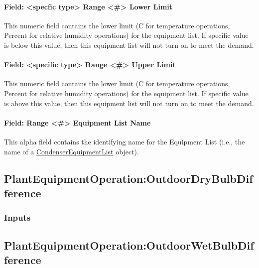 \paragraph{Field: \textless{}specfic type\textgreater{} Range \textless{}\#\textgreater{} Lower Limit}\label{field-specfic-type-range-lower-limit}

This numeric field contains the lower limit (C for temperature operations, Percent for relative humidity operations) for the equipment list. If specific value is below this value, then this equipment list will not turn on to meet the demand.

\paragraph{Field: \textless{}specific type\textgreater{} Range \textless{}\#\textgreater{} Upper Limit}\label{field-specific-type-range-upper-limit}

This numeric field contains the lower limit (C for temperature operations, Percent for relative humidity operations) for the equipment list. If specific value is above this value, then this equipment list will not turn on to meet the demand.

\paragraph{Field: Range \textless{}\#\textgreater{} Equipment List Name}\label{field-range-equipment-list-name-1}

This alpha field contains the identifying name for the Equipment List (i.e., the name of a \hyperref[condenserequipmentlist]{CondenserEquipmentList} object).

\subsection{PlantEquipmentOperation:OutdoorDryBulbDifference}\label{plantequipmentoperationoutdoordrybulbdifference}

\subsubsection{Inputs}\label{inputs-9-013}

\subsection{PlantEquipmentOperation:OutdoorWetBulbDifference}\label{plantequipmentoperationoutdoorwetbulbdifference}


